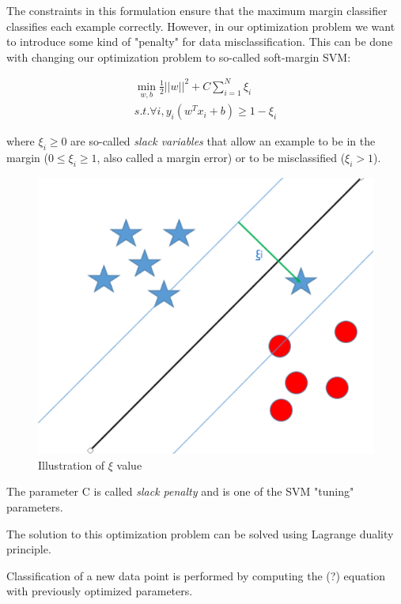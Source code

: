 The constraints in this formulation ensure that the maximum margin classifier classifies each example correctly. However, in our optimization problem we want to introduce some kind of "penalty" for data misclassification. This can be done with changing our optimization problem to so-called soft-margin SVM:

\begin{equation}
\begin{multlined}
\min_{w,b} \frac{1}{2}||w||^2 + C \sum_{i=1}^{N} \xi_{i}\\
s.t. \forall i, y_{i}(w^Tx_{i} + b) \geq 1 - \xi_{i}
\end{multlined}
\end{equation}

where $\xi_{i}\geq 0$ are so-called \textit{slack variables} that allow an example to be in the margin ($0\leq \xi_{i}\geq 1$, also called a margin error) or to be misclassified ($\xi_{i} > 1$).

\begin{figure}[H]
\centering
\includegraphics[scale=0.5]{img/svm/ksi.png}
\caption{Illustration of $\xi$ value}
\end{figure} 

The parameter C is called \textit{slack penalty} and is one of the SVM "tuning" parameters.

The solution to this optimization problem can be solved using Lagrange duality principle.

Classification of a new data point is performed by computing the  (?) equation with previously optimized parameters.

